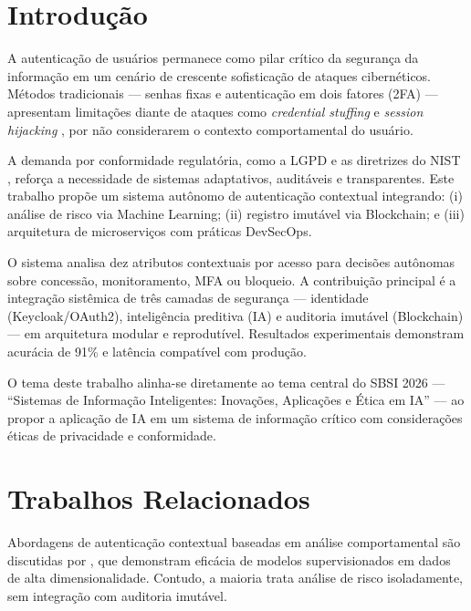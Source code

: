 \documentclass[sigconf,nonacm]{acmart}
\begin{document}
\section{Introdução}

A autenticação de usuários permanece como pilar crítico da segurança da informação em um cenário de crescente sofisticação de ataques cibernéticos. Métodos tradicionais --- senhas fixas e autenticação em dois fatores (2FA) --- apresentam limitações diante de ataques como \textit{credential stuffing} e \textit{session hijacking} \cite{owasp2023}, por não considerarem o contexto comportamental do usuário.

A demanda por conformidade regulatória, como a LGPD \cite{brasil2018} e as diretrizes do NIST \cite{nist2020}, reforça a necessidade de sistemas adaptativos, auditáveis e transparentes. Este trabalho propõe um sistema autônomo de autenticação contextual integrando: (i) análise de risco via Machine Learning; (ii) registro imutável via Blockchain; e (iii) arquitetura de microserviços com práticas DevSecOps.

O sistema analisa dez atributos contextuais por acesso para decisões autônomas sobre concessão, monitoramento, MFA ou bloqueio. A contribuição principal é a integração sistêmica de três camadas de segurança --- identidade (Keycloak/OAuth2), inteligência preditiva (IA) e auditoria imutável (Blockchain) --- em arquitetura modular e reprodutível. Resultados experimentais demonstram acurácia de 91\% e latência compatível com produção.

O tema deste trabalho alinha-se diretamente ao tema central do SBSI 2026 --- ``Sistemas de Informação Inteligentes: Inovações, Aplicações e Ética em IA'' --- ao propor a aplicação de IA em um sistema de informação crítico com considerações éticas de privacidade e conformidade.

\section{Trabalhos Relacionados}

Abordagens de autenticação contextual baseadas em análise comportamental são discutidas por \cite{goodfellow2016}, que demonstram eficácia de modelos supervisionados em dados de alta dimensionalidade. Contudo, a maioria trata análise de risco isoladamente, sem integração com auditoria imutável.
\end{document}
